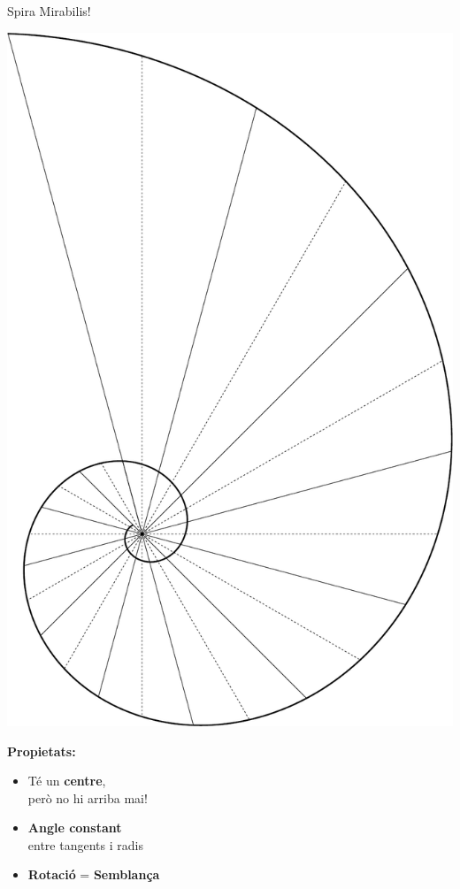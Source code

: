 \documentclass[14pt]{beamer}
\begin{document}
    \begin{frame}{Spira Mirabilis!}
        \begin{center}
            \begin{minipage}{20ex}
                \includegraphics[height=32ex]{pictures/Spiral_Phi_90.pdf}
            \end{minipage} \begin{minipage}{29ex}
                \textbf{\large \quad Propietats:}
                \bigskip
                \begin{itemize}
                    \small
                    \item Té un \textbf{centre},\\ però no hi arriba mai!\\[2ex]
                    \item \textbf{Angle constant}\\ entre tangents i radis\\[2ex]
                    \item \textbf{Rotació} = \textbf{Semblança}
                \end{itemize}
                \bigskip
            \end{minipage}            
        \end{center}
    \end{frame}


    {
    \begin{frame}[plain]
    \end{frame}
    }
\end{document}

